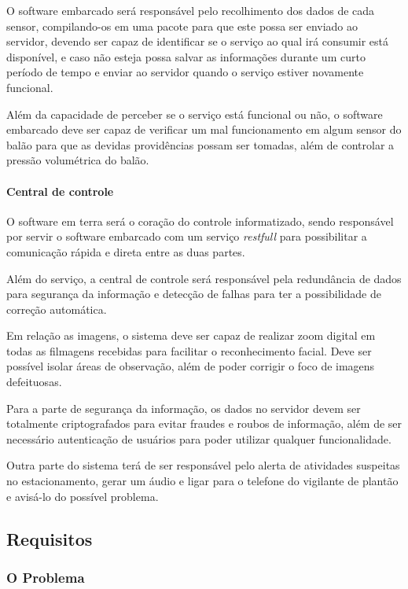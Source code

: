 O software embarcado será responsável pelo recolhimento dos dados de cada sensor, compilando-os em uma pacote para que este possa ser enviado ao servidor, devendo ser capaz de identificar se o serviço ao qual irá consumir está disponível, e caso não esteja possa salvar as informações durante um curto período de tempo e enviar ao servidor quando o serviço estiver novamente funcional.

Além da capacidade de perceber se o serviço está funcional ou não, o software embarcado deve ser capaz de verificar um mal funcionamento em algum sensor do balão para que as devidas providências possam ser tomadas, além de controlar a pressão volumétrica do balão.

\paragraph{Central de controle}

O software em terra será o coração do controle informatizado, sendo responsável por servir o software embarcado com um serviço \textit{restfull} para possibilitar a comunicação rápida e direta entre as duas partes.

Além do serviço, a central de controle será responsável pela redundância de dados para segurança da informação e detecção de falhas para ter a possibilidade de correção automática.

Em relação as imagens, o sistema deve ser capaz de realizar zoom digital em todas as filmagens recebidas para facilitar o reconhecimento facial. Deve ser possível isolar áreas de observação, além de poder corrigir o foco de imagens defeituosas.

Para a parte de segurança da informação, os dados no servidor devem ser totalmente criptografados para evitar fraudes e roubos de informação, além de ser necessário autenticação de usuários para poder utilizar qualquer funcionalidade.

Outra parte do sistema terá de ser responsável pelo alerta de atividades suspeitas no estacionamento, gerar um áudio e ligar para o telefone do vigilante de plantão e avisá-lo do possível problema.

\subsection{Requisitos}

\subsubsection{O Problema}

